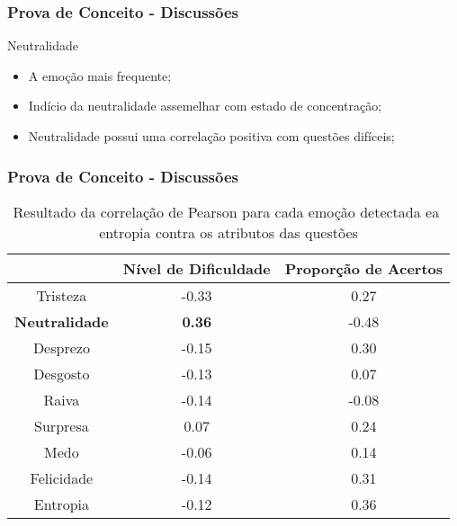 \begin{frame}
\frametitle{Prova de Conceito - Discussões}
\begin{block}{Neutralidade}
\begin{itemize}
\pause
\item A emo\c{c}\~ao mais frequente;
\pause
\item Ind\'{i}cio da neutralidade assemelhar com estado de concentra\c{c}\~ao;
\pause
\item Neutralidade possui uma correla\c{c}\~ao positiva com quest\~oes dif\'{i}ceis;

\end{itemize}
\end{block}

\end{frame}

\begin{frame}
\frametitle{Prova de Conceito - Discussões}
\begin{table}[]\footnotesize
\centering
\caption{Resultado​ ​da​ ​correla\c{c}\~ao​ ​de​ ​Pearson​ ​para​ ​cada​ ​emo\c{c}\~ao​ ​detectada
e​ ​a​ ​entropia​ ​contra​ ​os​ ​atributos​ ​das​ ​quest\~oes}
\label{my-label}
\begin{tabular}{|c|c|c|}
\hline
                      & \textbf{Nível de Dificuldade} & \textbf{Proporção de Acertos} \\ \hline
Tristeza	     & -0.33                & 0.27                          \\ \hline
\small \textbf{Neutralidade} & \small \textbf{0.36}                 & -0.48                \\ \hline
Desprezo     		& -0.15                         & 0.30                 \\ \hline
Desgosto              & -0.13                         & 0.07                          \\ \hline
Raiva                 & -0.14                         & -0.08                         \\ \hline
Surpresa              & 0.07                          & 0.24                          \\ \hline
Medo                  & -0.06                         & 0.14                          \\ \hline
Felicidade   		& -0.14                         & 0.31                 \\ \hline
Entropia     		& -0.12                         & 0.36                 \\ \hline
\end{tabular}
\end{table}
\end{frame}



